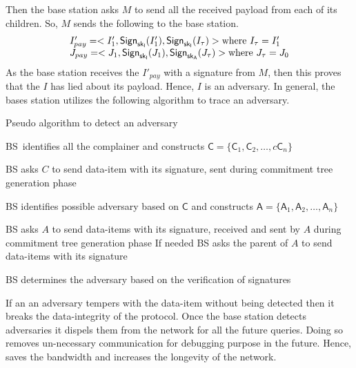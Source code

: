 		Then the base station asks $M$ to send all the received payload from each of its children.
		So, $M$ sends the following to the base station.
		\begin{equation*}
			\begin{array}{l}
				I'_{pay} = <I'_{1}, \textsf{Sign}_{\sf{sk}_{I}}(I'_{1}), \textsf{Sign}_{\sf{sk}_{I}}(I_{\tau})> \mbox{where}\ I_{\tau} = I'_{1}\\
				J_{pay} = <J_{1}, \textsf{Sign}_{\sf{sk}_{I}}(J_{1}), \textsf{Sign}_{\sf{sk}_{A}}(J_{\tau})> \mbox{where}\ J_{\tau} = J_{0}\\
			\end{array}
		\end{equation*}
		As the base station receives the $I'_{pay}$ with a signature from $M$, then this proves that the $I$ has lied about its payload.
		Hence, $I$ is an adversary.
		In general, the bases station utilizes the following algorithm to trace an adversary.
		\begin{algorithm}
			\caption{Pseudo algorithm to detect an adversary}
			\label{algo:detect-an-adversary}
			\begin{algorithmic}[1]

				\STATE BS\ identifies all the complainer and constructs $\textsf{C} = \{\textsf{C}_{1}, \textsf{C}_{2}, \dotsc, c\textsf{C}_{n}\}$

					\STATE BS asks $C$ to send data-item with its signature, sent during commitment tree generation phase
				
				\ENDFOR

				\STATE BS identifies possible adversary based on $\textsf{C}$ and constructs $\textsf{A} = \{\textsf{A}_{1},\textsf{A}_{2},\dotsc,\textsf{A}_{n}\}$


					\STATE BS asks $A$ to send data-items with its signature, received and sent by $A$ during commitment tree generation phase
					\STATE If needed BS  asks the parent of $A$ to send data-items with its signature
		
				\ENDFOR

				\STATE BS determines the adversary based on the verification of signatures

			\end{algorithmic}
		\end{algorithm}

		If an an adversary tempers with the data-item without being detected then it breaks the data-integrity of the protocol.
		Once the base station detects adversaries it dispels them from the network for all the future queries.
		Doing so removes un-necessary communication for debugging purpose in the future.
		Hence, saves the bandwidth and increases the longevity of the network.

